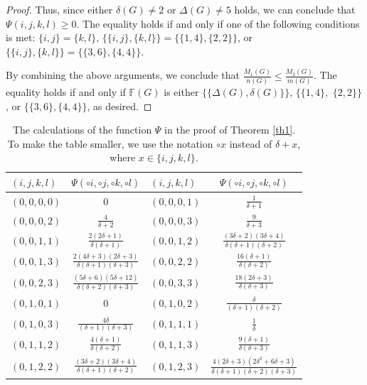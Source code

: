 \documentclass[12pt]{article}
\begin{document}
\begin{proof}
Thus, since either $\delta(G)\neq2$ or $\Delta(G)\neq5$ holds, we can conclude that $\Psi(i,j,k,l) \geq 0$. The equality holds if and only if one of the following conditions is met: $\{i,j\} = \{k,l\}$, $\{\{i,j\},\{k,l\}\} = \{\{1,4\},\{2,2\}\}$, or $\{\{i,j\},\{k,l\}\} = \{\{3,6\},\{4,4\}\}$.

By combining the above arguments, we conclude that $\frac{M_1(G)}{n(G)} \leq \frac{M_2(G)}{m(G)}$. The equality holds if and only if $\mathbb{F}(G)$ is either $\{\{\Delta(G),\delta(G)\}\}$, $\{\{1,4\},$ $\{2,2\}\}$, or $\{\{3,6\},\{4,4\}\}$, as desired.
\end{proof}

\begin{table}[ht!]
  \begin{center}
   \caption{The calculations of the function $\Psi$ in the proof of Theorem \ref{th1}. To make the table smaller, we use the notation $\circ x$ instead of $\delta+x$, where $x\in\{i,j,k,l\}$.}
    \label{tab1}
    \begin{tabular}{|l|c|l|c|}
    \hline
      $(i,j,k,l)$ & $\Psi(\circ i,\circ j,\circ k,\circ l)$ &  $(i,j,k,l)$ & $\Psi(\circ i,\circ j,\circ k,\circ l)$ \\
      \hline
  $(0,0,0,0)$  &$0$ & $(0,0,0,1)$& $\frac{1}{\delta+1}$\\
   \hline
  $(0,0,0,2)$  &$\frac{4}{\delta+2}$ & $(0,0,0,3)$& $\frac{9}{\delta+3}$\\
   \hline
  $(0,0,1,1)$  &$\frac{2(2\delta+1)}{\delta(\delta+1)}$ & $(0,0,1,2)$& $\frac{(3\delta+2)(3\delta+4)}{\delta(\delta+1)(\delta+2)}$\\
   \hline
  $(0,0,1,3)$  &$\frac{2(4\delta+3)(2\delta+3)}{\delta(\delta+1)(\delta+3)}$& $(0,0,2,2)$& $\frac{16(\delta+1)}{\delta(\delta+2)}$\\
   \hline
   $(0,0,2,3)$  &$\frac{(5\delta+6)(5\delta+12)}{\delta(\delta+2)(\delta+3)}$& $(0,0,3,3)$& $\frac{18(2\delta+3)}{\delta(\delta+3)}$\\
   \hline
   $(0,1,0,1)$  &$0$ & $(0,1,0,2)$& $\frac{\delta}{(\delta+1)(\delta+2)}$\\
   \hline
   $(0,1,0,3)$  &$\frac{4\delta}{(\delta+1)(\delta+3)}$ & $(0,1,1,1)$& $\frac{1}{\delta}$\\
   \hline
   $(0,1,1,2)$  &$\frac{4(\delta+1)}{\delta(\delta+2)}$ & $(0,1,1,3)$& $\frac{9(\delta+1)}{\delta(\delta+3)}$ \\
   \hline
  $(0,1,2,2)$  &$\frac{(3\delta+2)(3\delta+4)}{\delta(\delta+1)(\delta+2)}$ & $(0,1,2,3)$& $\frac{4(2\delta+3)(2\delta^2+6\delta+3)}{\delta(\delta+1)(\delta+2)(\delta+3)}$ \\

\end{tabular}
\end{center}
\end{table}
\end{document}
